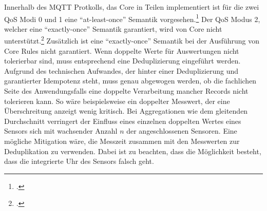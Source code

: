 Innerhalb des MQTT Protkolls, das \AWSIOT{} Core in Teilen implementiert ist für die zwei  \ac{QoS} Modi 0 und 1 eine \enquote{at-least-once} Semantik vorgesehen.\footcite[Vgl. auch im Folgenden][]{OASISOpenConsortium.2014} Der \ac{QoS} Modus 2, welcher eine \enquote{exactly-once} Semantik garantiert, wird von \AWSIOT{} Core nicht unterstützt.\footcite[Vgl.][]{AmazonWebServicesInc..o.J.bd} Zusätzlich ist eine \enquote{exactly-once} Semantik bei der Ausführung von \AWSIOT{} Core Rules nicht garantiert. Wenn doppelte Werte für Auswertungen nicht tolerierbar sind, muss entsprechend eine Deduplizierung eingeführt werden. Aufgrund des technischen Aufwandes, der hinter einer Deduplizierung und garantierter Idempotenz steht, muss genau abgewogen werden, ob die fachlichen Seite des Anwendungsfalls eine doppelte Verarbeitung mancher Records nicht tolerieren kann. So wäre beispielsweise ein doppelter Messwert, der eine Überschreitung anzeigt wenig kritisch. Bei Aggregationen wie dem gleitenden Durchschnitt verringert der Einfluss eines einzelnen doppelten Wertes eines Sensors sich mit wachsender Anzahl $n$ der angeschlossenen Sensoren. Eine mögliche Mitigation wäre, die Messzeit zusammen mit den Messwerten zur Deduplikation zu verwenden. Dabei ist zu beachten, dass die Möglichkeit besteht, dass die integrierte Uhr des Sensors falsch geht.